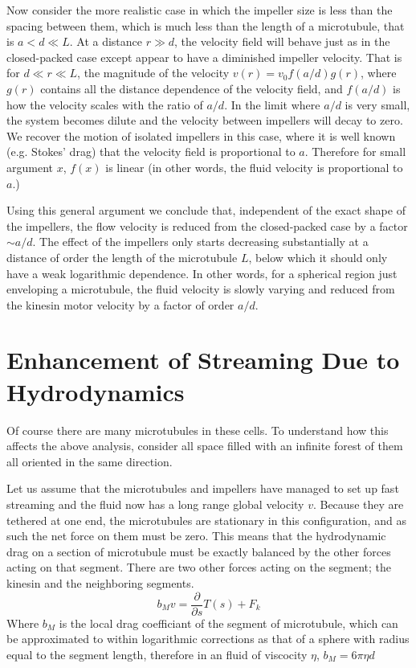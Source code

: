 \documentclass[11pt]{ucthesis}
\begin{document}
Now consider the more realistic case in which the impeller size is less than
the spacing between them, which is much less than the length of a
microtubule, that is $a < d \ll L$.  At a distance $r \gg d$, the
velocity field will behave just as in the closed-packed case except appear
to have a diminished impeller velocity. That is for $d \ll r \ll L$,
the magnitude of the velocity $v(r)  = v_0 f(a/d) g(r)$, where $g(r)$
contains all the distance dependence of the velocity field, and $f(a/d)$
is how the velocity scales with the ratio of $a/d$. In the limit where
$a/d$ is very small, the system becomes dilute and the velocity between 
impellers will decay to zero. We recover the motion of isolated impellers
in this case, where it is well known (e.g. Stokes' drag) that the velocity
field is proportional to $a$. Therefore for small argument $x$, $f(x)$ is
linear (in other words, the fluid velocity is proportional to $a$.) 

Using this general argument we conclude that, independent of the exact shape of the impellers,
the flow velocity is reduced from the closed-packed case by a factor $\sim a/d$. The effect
of the impellers only starts decreasing substantially at a distance of order the
length of the microtubule $L$, below which it should only have a weak logarithmic
dependence. In other words, for a spherical region just enveloping a microtubule,
the fluid velocity is slowly varying and reduced from the kinesin motor velocity 
by a factor of order $a/d$.

\section{Enhancement of Streaming Due to Hydrodynamics} 

Of course there are  many microtubules in these cells. To understand how this
affects the above analysis, consider all space filled with an infinite forest of them all oriented
in the same direction. 

Let us assume that the microtubules and impellers have managed to set up fast streaming and the fluid now has a long range global velocity $v$.
Because they are tethered at one end, the microtubules are stationary in this configuration, and as such the net force on them must be zero. 
This means that the hydrodynamic drag on a section of microtubule must be exactly balanced by the other forces acting on that segment.
There are two other forces acting on the segment; the kinesin and the neighboring segments.
\begin{equation}
\label{eq:mfnetMforce}
b_M v = \frac{\partial}{\partial s}T(s) + F_k
\end{equation}
Where $b_M$ is the local drag coefficiant of the segment of microtubule, which can be approximated to within logarithmic corrections as that of a sphere with radius equal to the segment length, therefore in an fluid of viscocity $\eta$, $b_M = 6\pi \eta d$
\end{document}
